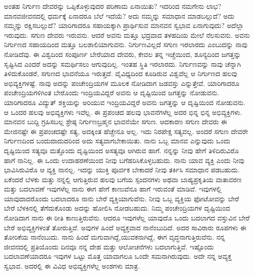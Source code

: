 ಅಂತಹ ನಿರ್ಗುಣ ದೇವರನ್ನು ಒಪ್ಪಿಕೊಳ್ಳುವುದರ ಪರಿಣಾಮ ಏನಾಯಿತು? ಇದರಿಂದ ನಮಗೇನು ಲಾಭ? ಮಾನವಜೀವನದಲ್ಲಿ ಧರ್ಮಕ್ಕೆ ಏನಾದರೂ ಬೆಲೆ ಇದೆಯೆ? ಅದು ನಮ್ಮನ್ನು ಸಮಾಧಾನ ಮಾಡಬಲ್ಲುದೆ? ಅದು ನಮ್ಮನ್ನು ರಕ್ಷಿಸಬಲ್ಲುದೆ? ಯಾರಿಗಾದರೂ ಸಹಾಯಕ್ಕಾಗಿ ಪ್ರಾರ್ಥಿಸುವ ಮಾನವನ ಸ್ವಭಾವ ಏನಾಗುವುದು? ಅದೆಲ್ಲಾ ಇರುವುದು. ಸಗುಣ ದೇವರು ಇರುವನು. ಆದರೆ ಅವನು ಮತ್ತೂ ಭದ್ರವಾದ ತಳಹದಿಯ ಮೇಲೆ ನೆಲಸುವನು. ಅವನು ನಿರ್ಗುಣದ ಸಹಾಯದಿಂದ ಮತ್ತೂ ಬಲಶಾಲಿಯಾಗುವನು. ನಿರ್ಗುಣವಿಲ್ಲದೆ ಸಗುಣ ಇರಲಾರದು ಎಂಬುದನ್ನು ನಾವು ನೋಡಿದೆವು. ಈ ವಿಶ್ವದಿಂದ ಸಂಪೂರ್ಣ ಬೇರೆಯಾದ ದೇವರು, ಕೇವಲ ತನ್ನ ಇಚ್ಚೆಯಿಂದ, ಶೂನ್ಯದಿಂದ ಜಗತ್ತನ್ನು ಸೃಷ್ಟಿಸಿದ ಎಂದರೆ ಅದನ್ನು ಸಮರ್ಥಿಸಲು ಆಗುವುದಿಲ್ಲ. ಇಂತಹ ಸ್ಥಿತಿ ಇರಲಾರದು. ನಿರ್ಗುಣವನ್ನು ನಾವು ಚೆನ್ನಾಗಿ ತಿಳಿದುಕೊಂಡರೆ, ಸಗುಣದ ಭಾವನೆಯೂ ಇರುತ್ತದೆ. ವೈವಿಧ್ಯದಿಂದ ಕೂಡಿರುವ ವಿಶ್ವವೆಲ್ಲ ಆ ನಿರ್ಗುಣದ ಹಲವು ಅಭಿವ್ಯಕ್ತಿಗಳಷ್ಟೆ. ನಾವು ಅದನ್ನು ಪಂಚೇಂದ್ರಿಯಗಳ ಮೂಲಕ ನೋಡಿದಾಗ ಜಡವಸ್ತು ಎನ್ನುತ್ತೇವೆ. ಯಾರಿಗಾದರೂ ಪಂಚೇಂದ್ರಿಯಗಳಿಗಿಂತ ಬೇರೊಂದು ಇಂದ್ರಿಯವಿದ್ದರೆ ಅವನು ಆ ದೃಷ್ಟಿಯಿಂದ ಜಗತ್ತನ್ನು ನೋಡುವನು. ಯಾರಿಗಾದರೂ ವಿದ್ಯುತ್ ಶಕ್ತಿಯನ್ನು ಅರಿಯುವ ಇಂದ್ರಿಯವಿದ್ದರೆ ಅವನು ಜಗತ್ತನ್ನು ಆ ದೃಷ್ಟಿಯಿಂದ ನೋಡುವನು. ಆ ಒಂದರ ಹಲವು ಅಭಿವ್ಯಕ್ತಿಗಳು ಇವೆಲ್ಲ. ಈ ಪ್ರಪಂಚದ ಹಲವು ಭಾವನೆಗಳೆಲ್ಲ ಅದರ ಭಿನ್ನ ಭಿನ್ನ ಅಭಿವ್ಯಕ್ತಿಗಳು. ಮಾನವನ ಬುದ್ದಿ ಗ್ರಹಿಸಬಲ್ಲ ಶ್ರೇಷ್ಠ ನಿರ್ಗುಣಬ್ರಹ್ಮನ ಭಾವನೆಯೇ ಸಗುಣ. ಆದಕಾರಣ ಸಗುಣ ದೇವರು ಈ ಮೇಜಿನಷ್ಟೇ ಈ ಪ್ರಪಂಚದಷ್ಟೇ ಸತ್ಯ, ಅದಕ್ಕಿಂತ ಹೆಚ್ಚೇನೂ ಅಲ್ಲ. ಇದು ನಿರಪೇಕ್ಷ ಸತ್ಯವಲ್ಲ. ಅಂದರೆ ಸಗುಣ ದೇವರೇ ನಿರ್ಗುಣದಿಂದ ಬಂದುದಾದುದರಿಂದ ಅದು ಸತ್ಯವಾಗಬೇಕಾಯಿತು. ನಾನು ಒಬ್ಬ ಮಾನವ ಎನ್ನುವುದು ಒಂದು ದೃಷ್ಟಿಯಿಂದ ಸತ್ಯವೂ ಮತ್ತೊಂದು ದೃಷ್ಟಿಯಿಂದ ಅಸತ್ಯವೂ ಆಗಿರುವ ಹಾಗೆ. ನನ್ನನ್ನು ನೀವು ಹೇಗೆ ತಿಳಿದಿರುವಿರೊ ಹಾಗೆ ನಾನಿಲ್ಲ. ಈ ಒಂದು ಉದಾಹರಣೆಯಿಂದ ನೀವು ಬಗೆಹರಿಸಿಕೊಳ್ಳಬಹುದು. ನಾನು ಯಾವ ವ್ಯಕ್ತಿ ಎಂದು ನೀವು ಭಾವಿಸಿರುವಿರೊ ಆ ವ್ಯಕ್ತಿ ನಾನಲ್ಲ. ಇದನ್ನು ಯುಕ್ತಿ ಪೂರ್ವಕ ಬೇಕಾದರೆ ನೀವು ತರ್ಕಿಸಿ ಸಮಾಧಾನ ಪಡಬಹುದು. ಏಕೆಂದರೆ ಬೆಳಕು ಮತ್ತು ನನ್ನಲ್ಲಿ ಆಗುತ್ತಿರುವ ಹಲವು ಬಗೆಯ ಸ್ಪಂದನಗಳು ಅಥವಾ ಬಾಹ್ಯಪ್ರಕೃತಿಯ ವಾತಾವರಣ ಮತ್ತು ಬದಲಾವಣೆ ಇವುಗಳೆಲ್ಲ ನಾನು ಈಗ ಹೇಗೆ ಕಾಣುವೆನೂ ಹಾಗೆ ಇರುವಂತೆ ಮಾಡಿವೆ. ಇವುಗಳಲ್ಲಿ ಯಾವುದಾದರೊಂದು ಬದಲಾದರೂ ನಾನು ಬೇರೆ ವ್ಯಕ್ತಿಯಾಗುವೆನು. ನೀವು ಒಬ್ಬ ವ್ಯಕ್ತಿಯ ಫೋಟೋವನ್ನು ಬೇರೆ ಬೇರೆ ಬೆಳಕಿನಲ್ಲಿ ತೆಗೆದುಕೊಂಡು ಅದನ್ನು ಹೋಲಿಸಿ ನೋಡಬಹುದು. ನಿಮ್ಮ ಪಂಚೇಂದ್ರಿಯಗಳ ದೃಷ್ಟಿಯಿಂದ ನೋಡಿದಾಗ ನಾನು ಈ ರೀತಿ ಕಾಣುತ್ತಿರುವೆನು. ಆದರೂ ಇವುಗಳೆಲ್ಲ ಯಾವುದೊ ಒಂದು ಬದಲಾಗದ ವಸ್ತುವಿನ ಬೇರೆ ಬೇರೆ ಅಭಿವ್ಯಕ್ತಿಗಳಂತೆ ತೋರುತ್ತಿವೆ. ಅವುಗಳ ಹಿಂದೆ ಅವ್ಯಕ್ತವಾದ ನಾನೆಂಬುದಿದೆ. ಅದರ ಸಾವಿರಾರು ರೂಪಗಳು ಈ ತೋರಿಕೆಯ ನಾನೆಂಬುದು. ನಾನು ಹಿಂದೆ ಮಗುವಾಗಿದ್ದೆ,\break ಯುವಕನಾಗಿದ್ದೆ, ಈಗ ವೃದ್ಧನಾಗುತ್ತಿರುವೆನು. ನನ್ನ ಜೀವನದಲ್ಲಿ ಪ್ರತಿಯೊಂದು ದಿನವೂ ನನ್ನ ದೇಹ ಮತ್ತು ಆಲೋಚನೆಗಳು ಬದಲಾಗುತ್ತಿವೆ. ಇಷ್ಟೊಂದು ಬದಲಾವಣೆಯಾದರೂ ಇವುಗಳ ಒಟ್ಟು ಮೊತ್ತ ಯಾವಾಗಲೂ ಒಂದೇ ಸಮನಾಗಿರುವುದು. ಅದೇ ನನ್ನ ಅವ್ಯಕ್ತ ಸ್ವಭಾವ. ಅದರಲ್ಲಿ ಈ ವಿವಿಧ ಅಭಿವ್ಯಕ್ತಿಗಳೆಲ್ಲ ಅಂಶಗಳು ಮಾತ್ರ.

